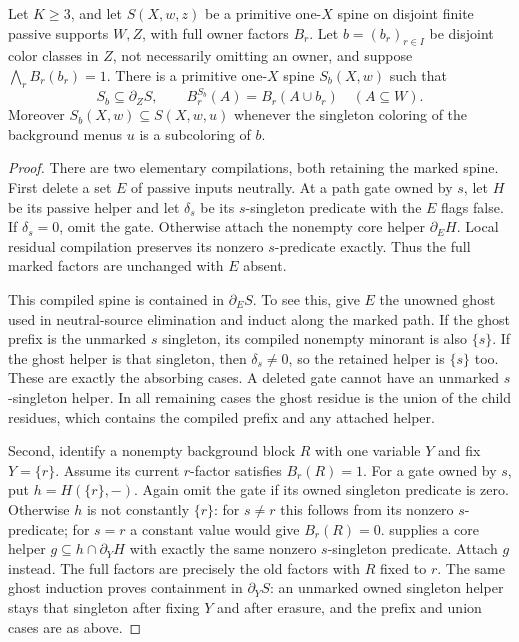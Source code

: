 \begin{lemma}
\label{core:lem:spine-background-erasure}
Let $K\geq3$, and let $S(X,w,z)$ be a primitive one-$X$ spine on
disjoint finite passive supports $W,Z$, with full owner factors $B_r$.
Let $b=(b_r)_{r\in I}$ be disjoint color classes in $Z$, not necessarily
omitting an owner, and suppose $\bigwedge_r B_r(b_r)=1$.
There is a primitive one-$X$ spine $S_b(X,w)$ such that
\[
 S_b\subseteq\partial_ZS,\qquad
 B_r^{S_b}(A)=B_r(A\cup b_r)\quad(A\subseteq W).
\]
Moreover $S_b(X,w)\subseteq S(X,w,u)$ whenever the singleton
coloring of the background menus $u$ is a subcoloring of $b$.
\end{lemma}
\begin{proof}
There are two elementary compilations, both retaining the marked spine.
First delete a set $E$ of passive inputs neutrally. At a path gate owned
by $s$, let $H$ be its passive helper and let $\delta_s$ be its
$s$-singleton predicate with the $E$ flags false. If $\delta_s=0$,
omit the gate. Otherwise attach the nonempty core helper $\partial_EH$.
Local residual compilation preserves its nonzero $s$-predicate exactly.
Thus the full marked factors are unchanged with $E$ absent.

This compiled spine is contained in $\partial_ES$. To see this, give
$E$ the unowned ghost used in neutral-source elimination and induct
along the marked path. If the ghost prefix is the unmarked $s$
singleton, its compiled nonempty minorant is also $\{s\}$. If the
ghost helper is that singleton, then $\delta_s\ne0$, so the retained
helper is $\{s\}$ too. These are exactly the absorbing cases. A
deleted gate cannot have an unmarked $s$-singleton helper. In all
remaining cases the ghost residue is the union of the child residues,
which contains the compiled prefix and any attached helper.

Second, identify a nonempty background block $R$ with one variable $Y$
and fix $Y=\{r\}$. Assume its current $r$-factor satisfies $B_r(R)=1$.
For a gate owned by $s$, put $h=H(\{r\},-)$. Again omit the gate
if its owned singleton predicate is zero. Otherwise $h$ is not constantly
$\{r\}$: for $s\ne r$ this follows from its nonzero $s$-predicate;
for $s=r$ a constant value would give $B_r(R)=0$.
 supplies a core helper
$g\subseteq h\cap\partial_YH$ with exactly the same nonzero
$s$-singleton predicate. Attach $g$ instead. The full factors are
precisely the old factors with $R$ fixed to $r$.
The same ghost induction proves containment in $\partial_YS$:
an unmarked owned singleton helper stays that singleton after fixing
$Y$ and after erasure, and the prefix and union cases are as above.


\end{proof}
